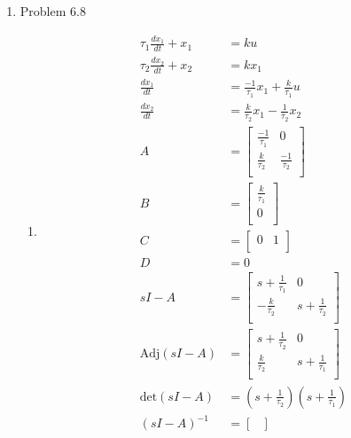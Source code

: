 \documentclass[12pt]{article}
\begin{document}
\begin{enumerate}
\newpage
\item Problem 6.8
\begin{enumerate}
    \item 
    \begin{align*}
        \tau_1 \frac{dx_1}{dt} + x_1 &= ku \\
        \tau_2 \frac{dx_2}{dt} + x_2 &= kx_1 \\
        \frac{dx_1}{dt} &= \frac{-1}{\tau_1} x_1 + \frac{k}{\tau_1} u \\
        \frac{dx_2}{dt} &= \frac{k}{\tau_2} x_1 - \frac{1}{\tau_2} x_2 \\
        A &= \begin{bmatrix}
            \frac{-1}{\tau_1} & 0 \\
            \frac{k}{\tau_2} & \frac{-1}{\tau_2} \\
        \end{bmatrix} \\
        B &= \begin{bmatrix}
            \frac{k}{\tau_1} \\
            0 \\
        \end{bmatrix} \\
        C &= \begin{bmatrix}
            0 & 1 \\
        \end{bmatrix} \\
        D &= 0 \\
        sI - A &= \begin{bmatrix}
            s + \frac{1}{\tau_1} & 0 \\
            -\frac{k}{\tau_2} & s + \frac{1}{\tau_2} \\
        \end{bmatrix} \\
        \mathrm{Adj}(sI - A) &= 
        \begin{bmatrix}
            s + \frac{1}{\tau_2} & 0 \\
            \frac{k}{\tau_2} & s + \frac{1}{\tau_1} \\
        \end{bmatrix} \\
        \mathrm{det}(sI - A) &= \left(s + \frac{1}{\tau_2}\right) \left(s + \frac{1}{\tau_1}\right) \\
        (sI - A)^{-1} &= 
        \begin{bmatrix}

\end{bmatrix}
\end{align*}
\end{enumerate}
\end{enumerate}
\end{document}
